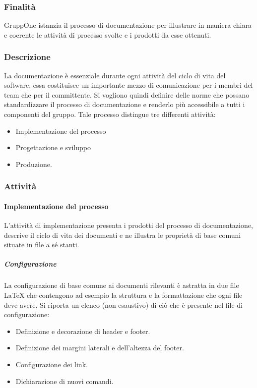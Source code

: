 \documentclass[../../norme-di-progetto.tex]{subfiles}
\begin{document}
\subsubsection{Finalità}%
\label{subs:documentazione/finalita}

GruppOne istanzia il processo di documentazione per illustrare in maniera chiara e coerente le attività di processo svolte e i prodotti da esse ottenuti.

\subsubsection{Descrizione}%
\label{subs:documentazione/descrizione}

La documentazione è essenziale durante ogni attività del ciclo di vita del software, essa costituisce un importante mezzo di comunicazione per i membri del team che per il committente.
Si vogliono quindi definire delle norme che possano standardizzare il processo di documentazione e renderlo più accessibile a tutti i componenti del gruppo.
Tale processo distingue tre differenti attività:
\begin{itemize}
  \item  Implementazione del processo
  \item  Progettazione e sviluppo
  \item  Produzione.
\end{itemize}

\subsubsection{Attività}%
\label{subs:documentazione/attivita}

\paragraph{Implementazione del processo}%
\label{subs:documentazione/implementazione}
L'attività di implementazione presenta i prodotti del processo di documentazione, descrive il ciclo di vita dei documenti e ne illustra le proprietà di base comuni situate in file a sé stanti.

\subparagraph{Configurazione}%
\label{par:configurazione}
La configurazione di base comune ai documenti rilevanti è astratta in due file \LaTeX{} che contengono ad esempio la struttura e la formattazione che ogni file deve avere.
Si riporta un elenco (non esaustivo) di ciò che è presente nel file di configurazione:

\begin{itemize}
  \item Definizione e decorazione di header e footer.
  \item Definizione dei margini laterali e dell'altezza del footer.
  \item Configurazione dei link.
  \item Dichiarazione di nuovi comandi.
\end{itemize}
\end{document}
